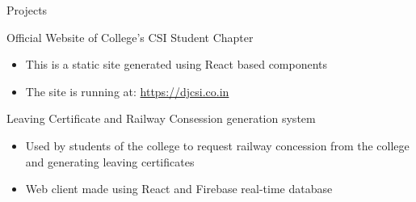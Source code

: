 \documentclass{article}
\newlength{\tabin}
\newlength{\secsep}
\newcommand{\lineunder}{\vspace*{-8pt} \\ \hspace*{-6pt} \hrulefill \\ \vspace*{-15pt}}
\newenvironment{tabbedsection}[1]{
	\begin{list}{}{
		\setlength{\itemsep}{0pt}
		\setlength{\labelsep}{0pt}
		\setlength{\labelwidth}{0pt}
		\setlength{\leftmargin}{\tabin}
		\setlength{\rightmargin}{\tabin}
		\setlength{\listparindent}{0pt}
		\setlength{\parsep}{0pt}
		\setlength{\parskip}{0pt}
		\setlength{\partopsep}{0pt}
		\setlength{\topsep}{#1}
	}
	\item[]
}{\end{list}}
\newenvironment{resume_section}[1]{
	\filbreak
	\vspace{2\secsep}
	\textsc{\large#1}
	\lineunder
	\begin{tabbedsection}{\secsep}
}{\end{tabbedsection}}
\newenvironment{resume_subsection}[2][]{
	\textbf{#2} \hfill {\footnotesize #1} \hspace{2em}
	\begin{tabbedsection}{0.5\secsep}
}{\end{tabbedsection}}
\newenvironment{subitems}{
	\renewcommand{\labelitemi}{-}
	\begin{itemize}
		\setlength{\labelsep}{1em}
}{\end{itemize}}
\begin{document}
\begin{resume_section}{Projects}
	\begin{resume_subsection}{Official Website of College's CSI Student Chapter}
		\begin{subitems}
			\item This is a static site generated using React based components
			\item The site is running at: \href{https://djcsi.co.in}{https://djcsi.co.in}
		\end{subitems}
	\end{resume_subsection}

	\begin{resume_subsection}{Leaving Certificate and Railway Consession generation system}
		\begin{subitems}
			\item Used by students of the college to request
				railway concession from the college and
				generating leaving certificates
			\item Web client made using React and Firebase real-time database
		\end{subitems}
	\end{resume_subsection}

\end{resume_section}

\vspace{1cm}
\end{document}
